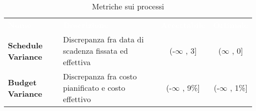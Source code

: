 
\begin{table}[H]
	\renewcommand{\arraystretch}{1.5}
	\centering
	\begin{longtable}{C{4cm} C{5cm} c c}
	
	\textcolor{white}{\textbf{Nome}} &
	\textcolor{white}{\textbf{Descrizione}} &
	\textcolor{white}{\textbf{Accettabile}} &
	\textcolor{white}{\textbf{Ottimale}}\\
	
	\textbf{Schedule Variance} &
	Discrepanza fra data di scadenza fissata ed effettiva &
	(-$\infty$ , 3] &
	($\infty$ , 0]\\
	
	\textbf{Budget Variance} &
	Discrepanza fra costo pianificato e costo effettivo &
	(-$\infty$ , 9\%] &
	(-$\infty$ , 1\%]\\
	
			
	\end{longtable}
	\caption{Metriche sui processi}
\end{table}